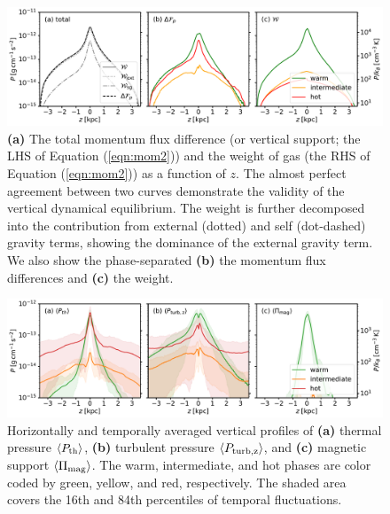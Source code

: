 \documentclass[twocolumn]{aastex62}
\newcommand\abrackets[1]{\left\langle{#1}\right\rangle}
\begin{document}
\begin{figure}
	\centering
 	\includegraphics[width=\textwidth]{vertical_equilibrium.pdf}
	\caption{{\bf (a)} The total momentum flux difference (or vertical support; the LHS of Equation (\ref{eqn:mom2})) and the weight of gas (the RHS of Equation (\ref{eqn:mom2})) as a function of $z$. The almost perfect agreement between two curves demonstrate the validity of the vertical dynamical equilibrium. The weight is further decomposed into the contribution from external (dotted) and self (dot-dashed) gravity terms, showing the dominance of the external gravity term. We also show the phase-separated {\bf (b)} the momentum flux differences and {\bf (c)} the weight.}
	\label{fig:vertical_equilibrium}
\end{figure}

\begin{figure}
	\centering
    \includegraphics[width=\textwidth]{mean_profiles.pdf}
	\caption{Horizontally and temporally averaged vertical profiles of {\bf (a)} thermal pressure $\abrackets{P_{\rm th}}$, {\bf (b)} turbulent pressure $\abrackets{P_{\rm turb,z}}$, and {\bf (c)} magnetic support $\abrackets{\Pi_{\rm mag}}$.  The warm, intermediate, and hot phases are color coded by green, yellow, and red, respectively. The shaded area covers the 16th and 84th percentiles of temporal fluctuations. } 
	\label{fig:mean_profiles}
\end{figure}

\end{document}

